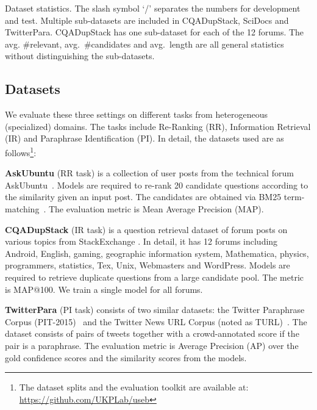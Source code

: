 \documentclass[11pt]{article}
\begin{document}
\begin{table*}[t]
\caption{Dataset statistics. The slash symbol `/' separates the numbers for development and test. Multiple sub-datasets are included in CQADupStack, SciDocs and TwitterPara. CQADupStack has one sub-dataset for each of the 12 forums. The avg. \#relevant, avg.\ \#candidates and avg.\ length are all general statistics without distinguishing the sub-datasets.}


\label{tbl:data_statistics}
\end{table*}



\subsection{Datasets}

We evaluate these three settings on different tasks from heterogeneous (specialized) domains. The tasks include Re-Ranking (RR), Information Retrieval (IR) and Paraphrase Identification (PI). In detail, the datasets used are as follows\footnote{The dataset splits and the evaluation toolkit are available at: \url{https://github.com/UKPLab/useb}}:

\textbf{AskUbuntu} (RR task) is a collection of user posts from the technical forum AskUbuntu~\citep{DBLP:conf/naacl/LeiJBJTMM16}. Models are required to re-rank 20 candidate questions according to the similarity given an input post. The candidates are obtained via BM25 term-matching~\citep{DBLP:conf/trec/RobertsonWJHG94}. The evaluation metric is Mean Average Precision (MAP).

\textbf{CQADupStack} (IR task) is a question retrieval dataset of forum posts on various topics from StackExchange \citep{DBLP:conf/adcs/HoogeveenVB15}. In detail, it has 12 forums including Android, English, gaming, geographic information system, Mathematica, physics, programmers, statistics, Tex, Unix, Webmasters and WordPress. Models are required to retrieve duplicate questions from a large candidate pool. The metric is MAP@100. We train a single model for all forums.

\textbf{TwitterPara} (PI task) consists of two similar datasets: the Twitter Paraphrase Corpus (PIT-2015)~\citep{DBLP:conf/semeval/XuCD15} and the Twitter News URL Corpus (noted as TURL)~\citep{DBLP:conf/emnlp/LanQHX17}. The dataset consists of pairs of tweets together with a crowd-annotated score if the pair is a paraphrase. The evaluation metric is Average Precision (AP) over the gold confidence scores and the similarity scores from the models.
\end{document}
